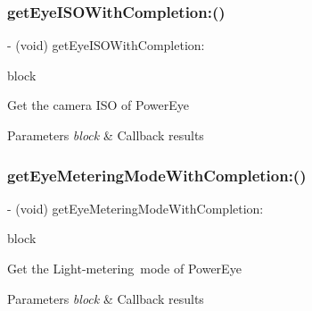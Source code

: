 \subsubsection{\texorpdfstring{get\+Eye\+I\+S\+O\+With\+Completion\+:()}{getEyeISOWithCompletion:()}}
{\footnotesize\ttfamily -\/ (void) get\+Eye\+I\+S\+O\+With\+Completion\+: \begin{DoxyParamCaption}\item[{(void($^\wedge$)(P\+V\+Eye\+Camera\+I\+SO iso, N\+S\+Error $\ast$\hyperlink{group___p_v_s_d_k___c_o_r_e___a_p_i___m_o_u_n_t_c_o_n_t_r_o_l_ga5a1de33b230662127568783314b4a54d}{\+\_\+\+Nullable} error))}]{block }\end{DoxyParamCaption}}

Get the camera I\+SO of Power\+Eye


\begin{DoxyParams}{Parameters}
{\em block} & Callback results \\
\hline
\end{DoxyParams}
\mbox{\label{interface_p_v_camera_ae5a1c30bcc202c74c934564298caa229}} 
\subsubsection{\texorpdfstring{get\+Eye\+Metering\+Mode\+With\+Completion\+:()}{getEyeMeteringModeWithCompletion:()}}
{\footnotesize\ttfamily -\/ (void) get\+Eye\+Metering\+Mode\+With\+Completion\+: \begin{DoxyParamCaption}\item[{(void($^\wedge$)(P\+V\+Eye\+Camera\+Metering\+Mode metering\+Mode, N\+S\+Error $\ast$\hyperlink{group___p_v_s_d_k___c_o_r_e___a_p_i___m_o_u_n_t_c_o_n_t_r_o_l_ga5a1de33b230662127568783314b4a54d}{\+\_\+\+Nullable} error))}]{block }\end{DoxyParamCaption}}

Get the Light-\/metering mode of Power\+Eye


\begin{DoxyParams}{Parameters}
{\em block} & Callback results \\
\hline
\end{DoxyParams}
\mbox{\label{interface_p_v_camera_a91b67612ede6ee6fd48ffeb5f2f25522}} 
